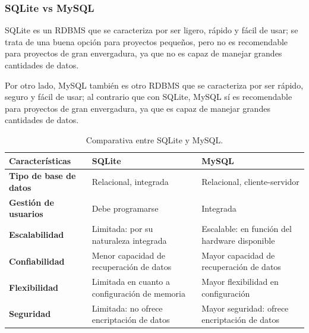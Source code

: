             \subsubsection{SQLite vs MySQL}

                SQLite es un RDBMS \cite{sqlite} que se caracteriza por ser ligero, rápido y fácil de usar; se trata de una buena opción para proyectos pequeños, pero no es recomendable para proyectos de gran envergadura, ya que no es capaz de manejar grandes cantidades de datos.
                
                Por otro lado, MySQL también es otro RDBMS \cite{mysql} que se caracteriza por ser rápido, seguro y fácil de usar; al contrario que con SQLite, MySQL sí es recomendable para proyectos de gran envergadura, ya que es capaz de manejar grandes cantidades de datos.

                \begin{table}[h]
                    \centering
                    
                    \begin{tabular}{|>{\centering\arraybackslash}m{4cm}|>{\centering\arraybackslash}m{5cm}|>{\centering\arraybackslash}m{5cm}|}
                        \hline
                        \textbf{Características} & \textbf{SQLite} & \textbf{MySQL} \\
                        \hline
                        \hline
                        \textbf{Tipo de base de datos} & Relacional, integrada & Relacional, cliente-servidor \\
                        \hline
                        \textbf{Gestión de usuarios} & Debe programarse & Integrada \\
                        \hline
                        \textbf{Escalabilidad} & Limitada: por su naturaleza integrada & Escalable: en función del hardware disponible \\
                        \hline
                        \textbf{Confiabilidad} & Menor capacidad de recuperación de datos & Mayor capacidad de recuperación de datos \\
                        \hline
                        \textbf{Flexibilidad} & Limitada en cuanto a configuración de memoria & Mayor flexibilidad en configuración \\
                        \hline
                        \textbf{Seguridad} & Limitada: no ofrece encriptación de datos & Mayor seguridad: ofrece encriptación de datos \\
                        \hline
                    \end{tabular}
                        
                    \caption{Comparativa entre SQLite y MySQL.}
                    \label{tabla:mysql-vs-sqlite}
                \end{table}

